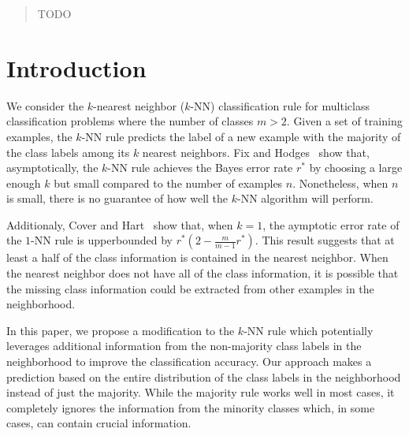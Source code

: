 \documentclass{article}
\begin{document}
 


\begin{abstract} 
TODO
\end{abstract} 

\section{Introduction}
\label{sec:intro}

We consider the $k$-nearest neighbor ($k$-NN) classification rule for
multiclass classification problems where the number of classes $m >
2$. Given a set of training examples, the $k$-NN rule predicts the
label of a new example with the majority of the class labels among its
$k$ nearest neighbors. Fix and Hodges~\cite{Fix1951} show that,
asymptotically, the $k$-NN rule achieves the Bayes error rate $r^*$ by
choosing a large enough $k$ but small compared to the number of
examples $n$. Nonetheless, when $n$ is small, there is no guarantee of
how well the $k$-NN algorithm will perform. 

Additionaly, Cover and Hart~\cite{Cover1967} show that, when $k = 1$,
the aymptotic error rate of the $1$-NN rule is upperbounded by $r^*(2
- \frac{m}{m-1}r^*)$. This result suggests that at least a half of the
class information is contained in the nearest neighbor. When the
nearest neighbor does not have all of the class information, it is
possible that the missing class information could be extracted from
other examples in the neighborhood.

In this paper, we propose a modification to the $k$-NN rule which
potentially leverages additional information from the non-majority
class labels in the neighborhood to improve the classification
accuracy. Our approach makes a prediction based on the entire
distribution of the class labels in the neighborhood instead of just
the majority. While the majority rule works well in most cases, it
completely ignores the information from the minority classes which, in
some cases, can contain crucial information.
\end{document}
